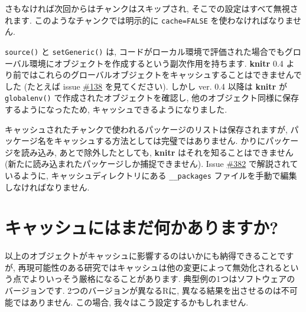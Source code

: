 \documentclass[
  lualatex,ja=standard,jafont=noto-otf]{bxjsreport}
\newenvironment{Shaded}{\begin{snugshade}}{\end{snugshade}}
\newcommand{\AttributeTok}[1]{\textcolor[rgb]{0.77,0.63,0.00}{#1}}
\newcommand{\CommentTok}[1]{\textcolor[rgb]{0.56,0.35,0.01}{\textit{#1}}}
\newcommand{\FunctionTok}[1]{\textcolor[rgb]{0.00,0.00,0.00}{#1}}
\newcommand{\NormalTok}[1]{#1}
\newcommand{\SpecialCharTok}[1]{\textcolor[rgb]{0.00,0.00,0.00}{#1}}
\begin{document}
さもなければ次回からはチャンクはスキップされ,
そこでの設定はすべて無視されます. このようなチャンクでは明示的に
\texttt{cache=FALSE} を使わなければなりません.

\texttt{source()} と \texttt{setGeneric()} は,
コードがローカル環境で評価された場合でもグローバル環境にオブジェクトを作成するという副次作用を持ちます.
\textbf{knitr} 0.4
より前ではこれらのグローバルオブジェクトをキャッシュすることはできませんでした
(たとえば issue \href{https://github.com/yihui/knitr/issues/138}{\#138}
を見てください). しかし ver. 0.4 以降は \textbf{knitr} が
\texttt{globalenv()} で作成されたオブジェクトを確認し,
他のオブジェクト同様に保存するようになったため,
キャッシュできるようになりました.

キャッシュされたチャンクで使われるパッケージのリストは保存されますが,
パッケージ名をキャッシュする方法としては完璧ではありません.
かりにパッケージを読み込み, あとで除外したとしても, \textbf{knitr}
はそれを知ることはできません
(新たに読み込まれたパッケージしか捕捉できません). Issue
\href{https://github.com/yihui/knitr/issues/382}{\#382}
で解説されているように, キャッシュディレクトリにある
\texttt{\_\_packages} ファイルを手動で編集しなければなりません.

\hypertarget{ux30adux30e3ux30c3ux30b7ux30e5ux306bux306fux307eux3060ux4f55ux304bux3042ux308aux307eux3059ux304b}{%
\section*{キャッシュにはまだ何かありますか?}\label{ux30adux30e3ux30c3ux30b7ux30e5ux306bux306fux307eux3060ux4f55ux304bux3042ux308aux307eux3059ux304b}}

以上のオブジェクトがキャッシュに影響するのはいかにも納得できることですが,
再現可能性のある研究ではキャッシュは他の変更によって無効化されるという点でよりいっそう厳格になることがあります.
典型例の1つはソフトウェアのバージョンです. 2つのバージョンが異なるRに,
異なる結果を出させるのは不可能ではありません. この場合,
我々はこう設定するかもしれません.

\begin{Shaded}
\end{Shaded}
\end{document}
